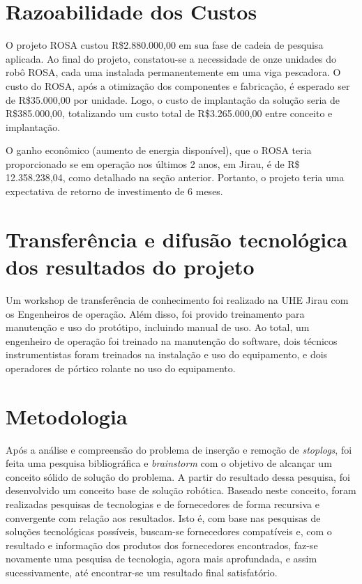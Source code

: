  
     
\section{Razoabilidade dos Custos}
O projeto ROSA custou R\$2.880.000,00 em sua fase de cadeia de pesquisa
aplicada. Ao final do projeto, constatou-se a necessidade de onze unidades 
do robô ROSA, cada uma instalada permanentemente em uma viga pescadora. O custo
do ROSA, após a otimização dos componentes e fabricação, é esperado ser de
R\$35.000,00 por unidade. Logo, o custo de implantação da solução seria de R\$385.000,00,
totalizando um custo total de R\$3.265.000,00 entre conceito e implantação.

O ganho econômico (aumento de energia disponível), que o ROSA teria
proporcionado se em operação nos últimos 2 anos, em Jirau, é de R\$
12.358.238,04, como detalhado na seção anterior. Portanto, o projeto teria uma
expectativa de retorno de investimento de 6 meses.

\section{Transferência e difusão tecnológica dos resultados do projeto}
Um workshop de transferência de conhecimento foi realizado na UHE Jirau com os
Engenheiros de operação. Além disso, foi provido treinamento para manutenção e
uso do protótipo, incluindo manual de uso. Ao total, um engenheiro de operação foi 
treinado na manutenção do software, dois técnicos instrumentistas foram treinados 
na instalação e uso do equipamento, e dois operadores de pórtico rolante no uso 
do equipamento.

\section{Metodologia}

Após a análise e compreensão do problema de inserção e remoção de
\textit{stoplogs}, foi feita uma pesquisa bibliográfica e \textit{brainstorm}
com o objetivo de alcançar um conceito sólido de solução do problema. A partir
do resultado dessa pesquisa, foi desenvolvido um conceito base de solução robótica. 
Baseado neste conceito, foram realizadas pesquisas de tecnologias e de fornecedores 
de forma recursiva e convergente com relação aos resultados. Isto é, com base
nas pesquisas de soluções tecnológicas possíveis, buscam-se fornecedores
compatíveis e, com o resultado e informação dos produtos dos fornecedores
encontrados, faz-se novamente uma pesquisa de tecnologia, agora mais
aprofundada, e assim sucessivamente, até encontrar-se um resultado final
satisfatório.

